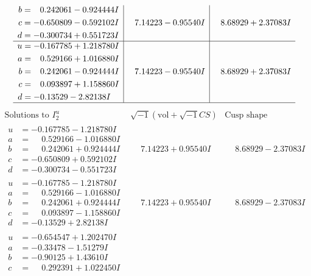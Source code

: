 \documentclass[1p]{elsarticle_modified}
\theoremstyle{definition}
\newcommand{\I}{\sqrt{-1}}
\begin{document}
$$\begin{array}{c|c|c}
\begin{aligned}
b &= \phantom{-}0.242061 - 0.924444 I \\
c &= -0.650809 - 0.592102 I \\
d &= -0.300734 + 0.551723 I\end{aligned}
 & \phantom{-}7.14223 - 0.95540 I & \phantom{-}8.68929 + 2.37083 I \\ \hline\begin{aligned}
u &= -0.167785 + 1.218780 I \\
a &= \phantom{-}0.529166 + 1.016880 I \\
b &= \phantom{-}0.242061 - 0.924444 I \\
c &= \phantom{-}0.093897 + 1.158860 I \\
d &= -0.13529 - 2.82138 I\end{aligned}
 & \phantom{-}7.14223 - 0.95540 I & \phantom{-}8.68929 + 2.37083 I\\
 \hline 
 \end{array}$$\newpage$$\begin{array}{c|c|c}  
\text{Solutions to }I^u_{2}& \I (\text{vol} + \sqrt{-1}CS) & \text{Cusp shape}\\
 \hline 
\begin{aligned}
u &= -0.167785 - 1.218780 I \\
a &= \phantom{-}0.529166 - 1.016880 I \\
b &= \phantom{-}0.242061 + 0.924444 I \\
c &= -0.650809 + 0.592102 I \\
d &= -0.300734 - 0.551723 I\end{aligned}
 & \phantom{-}7.14223 + 0.95540 I & \phantom{-}8.68929 - 2.37083 I \\ \hline\begin{aligned}
u &= -0.167785 - 1.218780 I \\
a &= \phantom{-}0.529166 - 1.016880 I \\
b &= \phantom{-}0.242061 + 0.924444 I \\
c &= \phantom{-}0.093897 - 1.158860 I \\
d &= -0.13529 + 2.82138 I\end{aligned}
 & \phantom{-}7.14223 + 0.95540 I & \phantom{-}8.68929 - 2.37083 I \\ \hline\begin{aligned}
u &= -0.654547 + 1.202470 I \\
a &= -0.33478 - 1.51279 I \\
b &= -0.90125 + 1.43610 I \\
c &= \phantom{-}0.292391 + 1.022450 I \\

\end{aligned}
\end{array}$$
\end{document}
